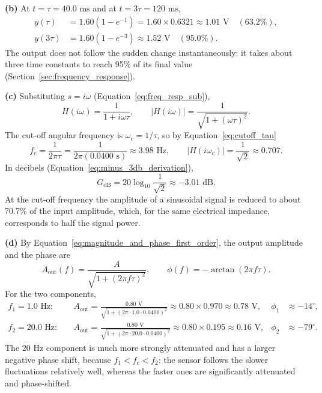 \textbf{(b)} At $t = \tau = 40.0\text{ ms}$ and at $t = 3\tau = 120\text{ ms}$,
\begin{align*}
y(\tau) &= 1.60\left(1 - e^{-1}\right) = 1.60 \times 0.6321 \approx 1.01\text{ V} \quad (63.2\%), \\
y(3\tau) &= 1.60\left(1 - e^{-3}\right) \approx 1.52\text{ V} \quad (95.0\%).
\end{align*}
The output does not follow the sudden change instantaneously: it takes about three time constants to reach 95\% of its final value (Section~\ref{sec:frequency_response}).

\textbf{(c)} Substituting $s = i\omega$ (Equation~\eqref{eq:freq_resp_sub}),
\begin{equation*}
H(i\omega) = \frac{1}{1 + i\omega\tau}, \qquad |H(i\omega)| = \frac{1}{\sqrt{1 + (\omega\tau)^2}}.
\end{equation*}
The cut-off angular frequency is $\omega_c = 1/\tau$, so by Equation~\eqref{eq:cutoff_tau}
\begin{equation*}
f_c = \frac{1}{2\pi\tau} = \frac{1}{2\pi(0.0400\text{ s})} \approx 3.98\text{ Hz}, \qquad |H(i\omega_c)| = \frac{1}{\sqrt{2}} \approx 0.707.
\end{equation*}
In decibels (Equation~\eqref{eq:minus_3db_derivation}),
\begin{equation*}
G_{\text{dB}} = 20\log_{10}\frac{1}{\sqrt{2}} \approx -3.01\text{ dB}.
\end{equation*}
At the cut-off frequency the amplitude of a sinusoidal signal is reduced to about 70.7\% of the input amplitude, which, for the same electrical impedance, corresponds to half the signal power.

\textbf{(d)} By Equation~\eqref{eq:magnitude_and_phase_first_order}, the output amplitude and the phase are
\begin{equation*}
A_{\text{out}}(f) = \frac{A}{\sqrt{1 + (2\pi f\tau)^2}}, \qquad \phi(f) = -\arctan(2\pi f\tau).
\end{equation*}
For the two components,
\begin{align*}
f_1 = 1.0\text{ Hz}: &\quad A_{\text{out}} = \frac{0.80\text{ V}}{\sqrt{1 + (2\pi \cdot 1.0 \cdot 0.0400)^2}} \approx 0.80 \times 0.970 \approx 0.78\text{ V}, &\phi_1 &\approx -14^\circ, \\[1ex]
f_2 = 20.0\text{ Hz}: &\quad A_{\text{out}} = \frac{0.80\text{ V}}{\sqrt{1 + (2\pi \cdot 20.0 \cdot 0.0400)^2}} \approx 0.80 \times 0.195 \approx 0.16\text{ V}, &\phi_2 &\approx -79^\circ.
\end{align*}
The $20\text{ Hz}$ component is much more strongly attenuated and has a larger negative phase shift, because $f_1 < f_c < f_2$: the sensor follows the slower fluctuations relatively well, whereas the faster ones are significantly attenuated and phase-shifted.

